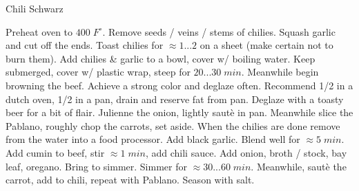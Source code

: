 \begin{recipe}[
	preparationtime = 1 hour,
	bakingtime = 1 hour,
	portion = 4 people,
	]
	{Chili Schwarz}

	
	\preparation
	{
		\step Preheat oven to $400\;F^\circ$. Remove seeds / veins / stems of chilies. Squash garlic and cut off the ends. Toast chilies for $\approx 1...2$ on a sheet (make certain not to burn them).
		\step Add chilies \& garlic to a bowl, cover w/ boiling water. Keep submerged, cover w/ plastic wrap, steep for $20...30\;min$.
		\step Meanwhile begin browning the beef. Achieve a strong color and deglaze often. Recommend 1/2 in a dutch oven, 1/2 in a pan, drain and reserve fat from pan. Deglaze with a toasty beer for a bit of flair.
		\step Julienne the onion, lightly saut\`{e} in pan. Meanwhile slice the Pablano, roughly chop the carrots, set aside.
		\step When the chilies are done remove from the water into a food processor. Add black garlic. Blend well for $\approx5\;min$.
		\step Add cumin to beef, stir $\approx 1\;min$, add chili sauce.
		\step Add onion, broth / stock, bay leaf, oregano. Bring to simmer. Simmer for $\approx30...60\;min$.
		\step Meanwhile, saut\`{e} the carrot, add to chili, repeat with Pablano. Season with salt.
	}
	

\end{recipe}
